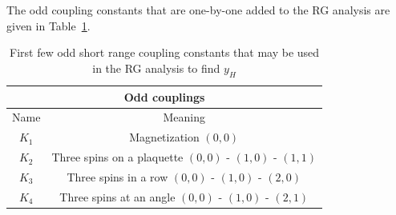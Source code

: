 \documentclass[12pt]{article}
\begin{document}
The odd coupling constants that are one-by-one added to the RG analysis are given in Table~\ref{odd}. 

\begin{table}[H]
\centering
\begin{tabular}{|c |c|} 
 \hline
\multicolumn{2}{|c|}{Odd couplings} \\ 
 \hline
 Name & Meaning\\
 \hline
 $K_1$ & Magnetization $(0,0)$\\
 $K_2$ & Three spins on a plaquette $(0,0)$ - $(1,0)$ - $(1,1)$\\
 $K_3$ & Three spins in a row $(0,0)$ - $(1,0)$ - $(2,0)$\\
 $K_4$ & Three spins at an angle $(0,0)$ - $(1,0)$ - $(2,1)$\\
 \hline
 \end{tabular}
 \caption{\label{odd}First few odd short range coupling constants that may be used in the RG analysis to find $y_H$}
\end{table}
\end{document}
